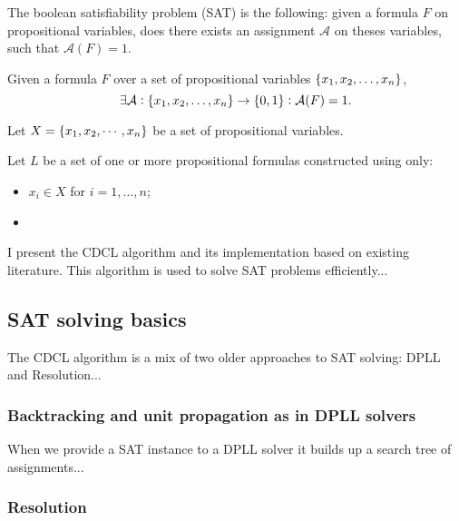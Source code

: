 The boolean satisfiability problem (SAT) is the following: given a formula $F$ on propositional variables, does there exists an assignment $\mathcal{A}$ on theses variables, such that $\mathcal{A}(F)=1$.

Given a formula $F$ over a set of propositional variables $\set{x_1,x_2,\dots,x_n}$, \[
\exists\mathcal{A}:\set{x_1,x_2,\dots,x_n}\to\set{0,1}:\mathcal{A}(F)=1.
\]

\begin{tcolorbox}[colframe=defcolor,title={\color{white}\bf Boolean Satisfiability Problem (SAT)}]
\begin{definition}
Let $X=\set{x_1,x_2,\cdots, x_n}$ be a set of propositional variables.

Let $L$ be a set of one or more propositional formulas constructed using only:
\begin{itemize}
	\item $x_i\in X$ for $i=1,\dots,n$;
	\item 
\end{itemize}

%
%
%
%
\end{definition}
\end{tcolorbox}


	I present the CDCL algorithm and its implementation based on existing literature. This algorithm is used to solve SAT problems efficiently...

\subsection{SAT solving basics}

The CDCL algorithm is a mix of two older approaches to SAT solving: DPLL and Resolution...

\subsubsection{Backtracking and unit propagation as in DPLL solvers}

When we provide a SAT instance to a DPLL solver it builds up a search tree of assignments...

\subsubsection{Resolution}

